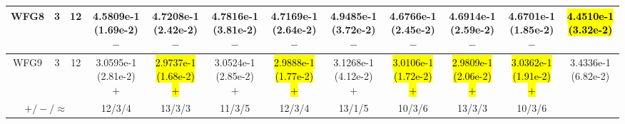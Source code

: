 \documentclass[journal]{IEEEtran}
\begin{document}
\begin{table*}[htbp]
\begin{tabular}{cccccccccccc}
\hline
\multirow{1}{*}{WFG8}&3&12&4.5809e-1 (1.69e-2) $-$&4.7208e-1 (2.42e-2) $-$&4.7816e-1 (3.81e-2) $-$&4.7169e-1 (2.64e-2) $-$&4.9485e-1 (3.72e-2) $-$&4.6766e-1 (2.45e-2) $-$&4.6914e-1 (2.59e-2) $-$&4.6701e-1 (1.85e-2) $-$&\hl{4.4510e-1 (3.32e-2)}\\
\hline
\multirow{1}{*}{WFG9}&3&12&3.0595e-1 (2.81e-2) $+$&\hl{2.9737e-1 (1.68e-2) $+$}&3.0524e-1 (2.85e-2) $+$&\hl{2.9888e-1 (1.77e-2) $+$}&3.1268e-1 (4.12e-2) $+$&\hl{3.0106e-1 (1.72e-2) $+$}&\hl{2.9809e-1 (2.06e-2) $+$}&\hl{3.0362e-1 (1.91e-2) $+$}&3.4336e-1 (6.82e-2)\\
\hline
\multicolumn{3}{c}{$+/-/\approx$}&12/3/4&13/3/3&11/3/5&12/3/4&13/1/5&10/3/6&13/3/3&10/3/6&\\
\bottomrule
\end{tabular}
\label{No Label}
\end{table*}
\end{document}
